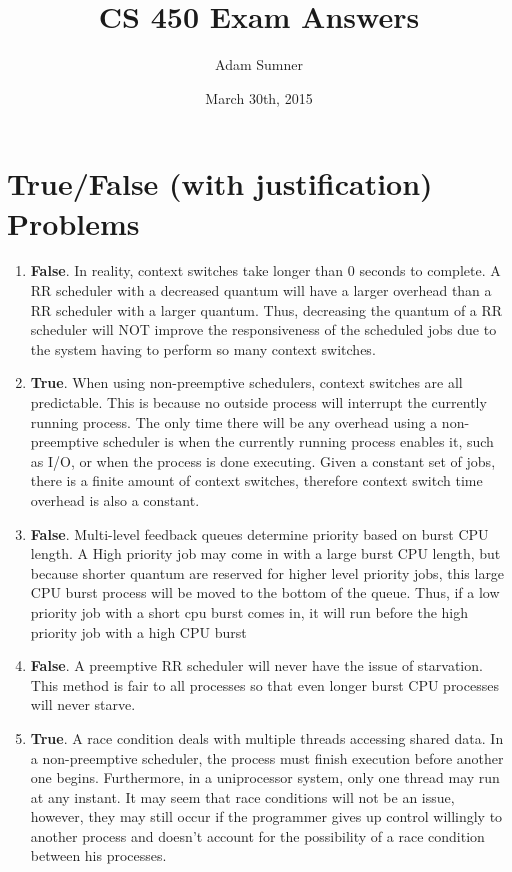\documentclass[12pt]{article}
\title{\textbf{CS 450 Exam Answers}}
\author{Adam Sumner}
\date{March 30th, 2015}
\begin{document}
\maketitle


\section{True/False (with justification) Problems}

\begin{enumerate}
	\item \textbf{False}. In reality, context switches take longer than 0 seconds to complete. A RR scheduler with a decreased quantum will have a larger overhead than a RR scheduler with a larger quantum. Thus, decreasing the quantum of a RR scheduler will NOT improve the responsiveness of the scheduled jobs due to the system having to perform so many context switches. 
	\item \textbf{True}. When using non-preemptive schedulers, context switches are all predictable. This is because no outside process will interrupt the currently running process. The only time there will be any overhead using a non-preemptive scheduler is when the currently running process enables it, such as I/O, or when the process is done executing. Given a constant set of jobs, there is a finite amount of context switches, therefore context switch time overhead is also a constant.
	
	\item \textbf{False}. Multi-level feedback queues determine priority based on burst CPU length. A High priority job may come in with a large burst CPU length, but because shorter quantum are reserved for higher level priority jobs, this large CPU burst process will be moved to the bottom of the queue. Thus, if a low priority job with a short cpu burst comes in, it will run before the high priority job with a high CPU burst
	
	\item \textbf{False}. A preemptive RR scheduler will never have the issue of starvation. This method is fair to all processes so that even longer burst CPU processes will never starve.
	
	\item \textbf{True}. A race condition deals with multiple threads accessing shared data. In a non-preemptive scheduler, the process must finish execution before another one begins. Furthermore, in a uniprocessor system, only one thread may run at any instant. It may seem that race conditions will not be an issue, however, they may still occur if the programmer gives up control willingly to another process and doesn't account for the possibility of a race condition between his processes. 
\end{enumerate}
\end{document}
